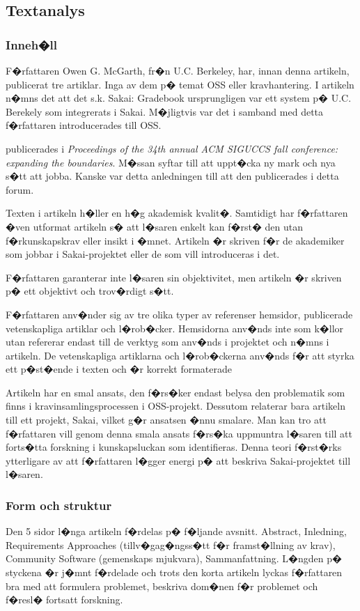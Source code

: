 \documentclass[11pt, oneside]{article}   	%
\begin{document}
\subsection{Textanalys}
\subsubsection{Inneh�ll}
F�rfattaren Owen G. McGarth, fr�n U.C. Berkeley, har, innan denna artikeln, publicerat tre artiklar. Inga av dem p� temat OSS eller kravhantering. I artikeln n�mns det att det s.k. Sakai: Gradebook ursprungligen var ett system p� U.C. Berekely som integrerats i Sakai. M�jligtvis var det i samband med detta f�rfattaren introducerades till OSS.

\cite{McGrath2006} publicerades i \emph{Proceedings of the 34th annual ACM SIGUCCS fall conference: expanding the boundaries}. M�ssan syftar till att uppt�cka ny mark och nya s�tt att jobba. Kanske var detta anledningen till att den publicerades i detta forum.

Texten i artikeln h�ller en h�g akademisk kvalit�. Samtidigt har f�rfattaren �ven utformat artikeln s� att l�saren enkelt kan f�rst� den utan f�rkunskapskrav eller insikt i �mnet. Artikeln �r skriven f�r de akademiker som jobbar i Sakai-projektet eller de som vill introduceras i det.

F�rfattaren garanterar inte l�saren sin objektivitet, men artikeln �r skriven p� ett objektivt och trov�rdigt s�tt.

F�rfattaren anv�nder sig av tre olika typer av referenser hemsidor, publicerade vetenskapliga artiklar och l�rob�cker. Hemsidorna anv�nds inte som k�llor utan refererar endast till de verktyg som anv�nds i projektet och n�mns i artikeln. De vetenskapliga artiklarna och l�rob�ckerna anv�nds f�r att styrka ett p�st�ende i texten och �r korrekt formaterade

Artikeln har en smal ansats, den f�rs�ker endast belysa den problematik som finns i kravinsamlingsprocessen i OSS-projekt. Dessutom relaterar bara artikeln till ett projekt, Sakai, vilket g�r ansatsen �nnu smalare. Man kan tro att f�rfattaren vill genom denna smala ansats f�rs�ka uppmuntra l�saren till att forts�tta forskning i kunskapsluckan som identifieras. Denna teori f�rst�rks ytterligare av att f�rfattaren l�gger energi p� att beskriva Sakai-projektet till l�saren.

\subsubsection{Form och struktur}
Den 5 sidor l�nga artikeln f�rdelas p� f�ljande avsnitt. Abstract, Inledning, Requirements Approaches (tillv�gag�ngss�tt f�r framst�llning av krav), Community Software (gemenskaps mjukvara), Sammanfattning. L�ngden p� styckena �r j�mnt f�rdelade och trots den korta artikeln lyckas f�rfattaren bra med att formulera problemet, beskriva dom�nen f�r problemet och f�resl� fortsatt forskning.
\end{document}

